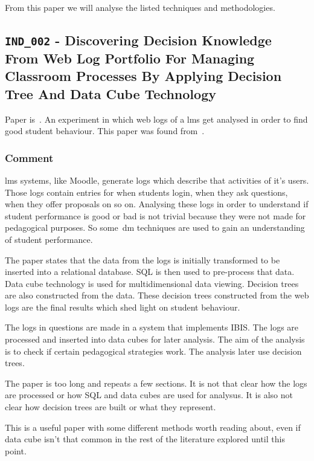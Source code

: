 From this paper we will analyse the listed techniques and methodologies.

\subsection{\texttt{IND\_002} - Discovering Decision Knowledge From Web Log
Portfolio For Managing Classroom Processes By Applying Decision Tree And Data
Cube Technology}

Paper is~\cite{ind_002}. An experiment in which web logs of a \gls{lms} get
analysed in order to find good student behaviour. This paper was found
from~\cite{ind_001}.

\subsubsection{Comment}

\gls{lms} systems, like Moodle, generate logs which describe that activities of
it's users. Those logs contain entries for when students login, when they ask
questions, when they offer proposals on so on. Analysing these logs in order to
understand if student performance is good or bad is not trivial because they
were not made for pedagogical purposes. So some~\gls{dm} techniques are used to
gain an understanding of student performance.

The paper states that the data from the logs is initially transformed to be
inserted into a relational database. SQL is then used to pre-process that data.
Data cube technology is used for multidimensional data viewing. Decision trees
are also constructed from the data. These decision trees constructed from the
web logs are the final results which shed light on student behaviour.

The logs in questions are made in a system that implements IBIS. The logs are
processed and inserted into data cubes for later analysis. The aim of the
analysis is to check if certain pedagogical strategies work. The analysis later
use decision trees.

The paper is too long and repeats a few sections. It is not that clear how the
logs are processed or how SQL and data cubes are used for analysus. It is also
not clear how decision trees are built or what they represent.

This is a useful paper with some different methods worth reading about, even if
data cube isn't that common in the rest of the literature explored until this
point.

